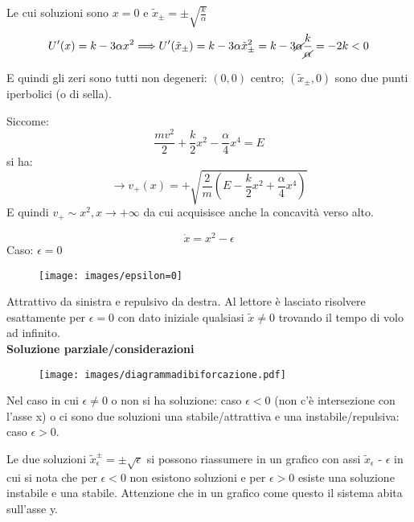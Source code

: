 \documentclass[Main.tex]{subfiles}
\begin{document}
\begin{appendic}
Le cui soluzioni sono $x=0$ e $\tilde x _\pm = \pm \sqrt{\frac{k}{\alpha}}$
\begin{equation}
  U'(x) = k - 3 \alpha x^2 \Longrightarrow U'(\tilde x_\pm) = k- 3 \alpha \tilde x _ \pm ^ 2 = k - 3 \cancel{\alpha} \frac{k}{\cancel{\alpha}}= -2k <0
\end{equation}

E quindi gli zeri sono tutti non degeneri: $(0,0)$ centro; $(\tilde x_ \pm , 0) $ sono due punti iperbolici (o di sella).\\
\begin{osservazione}
	Siccome:
\begin{equation}
  	\frac{mv^2}{2} + \frac{k}{2} x^2 - \frac{\alpha}{4} x^4 =E
\end{equation}
	si ha:
\begin{equation}
  	\longrightarrow v_+(x)= + \sqrt{\frac{2}{m}(E- \frac{k}{2}x^2 + \frac{\alpha}{4}x^4)}
\end{equation}
	E quindi $v_+ \sim x^2, x \longrightarrow + \infty$ da cui acquisisce anche la concavità verso alto.
\end{osservazione}
\end{appendic}

\begin{appendic}
\begin{equation}
  \dot x = x^2 - \epsilon
\end{equation}
Caso: $\epsilon=0$
	\begin{figure}[H]
    \centering
  \texttt{[image: images/epsilon=0]}
\end{figure}





Attrattivo da sinistra e repulsivo da destra. \bigskip
Al lettore è lasciato risolvere esattamente per $\epsilon=0$ con dato iniziale qualsiasi $\tilde x \neq 0$ trovando il tempo di volo ad infinito.
\\
\textbf{Soluzione parziale/considerazioni}
\begin{figure}[H]
    \centering
  \texttt{[image: images/diagrammadibiforcazione.pdf]}
\end{figure}


Nel caso in cui $\epsilon \neq 0$ o non si ha soluzione: caso $\epsilon <0$ (non c'è intersezione con l'asse x) o ci sono due soluzioni una stabile/attrattiva e una instabile/repulsiva: caso $\epsilon >0$.

Le due soluzioni
$\tilde x ^ \pm _\epsilon = \pm \sqrt{\epsilon}$ si possono riassumere in un grafico con assi $\tilde x_\epsilon$ - $\epsilon$ in cui si nota che per $\epsilon<0$ non esistono soluzioni e per $\epsilon >0 $ esiste una soluzione instabile e una stabile. Attenzione che in un grafico come questo il sistema abita sull'asse y.	
\end{appendic}
\end{document}
